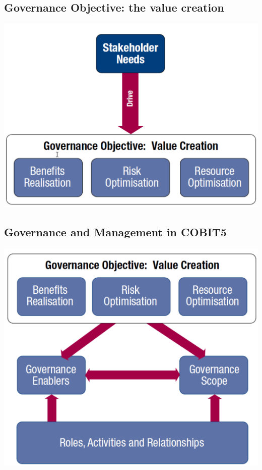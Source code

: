 \documentclass[a4]{article}
\begin{document}
\begin{multicols}{3}
\subsection{Governance Objective: the value creation}
\begin{center}
    \begin{minipage}{0.5\columnwidth}
        \includegraphics[width=\columnwidth]{governance-objective-value-creation.png}
    \end{minipage}
\end{center}

\subsection{Governance and Management in COBIT5}
\begin{center}
    \begin{minipage}{0.5\columnwidth}
        \includegraphics[width=\columnwidth]{governance-management-cobit5.png}
    \end{minipage}
\end{center}


\end{multicols}
\end{document}
